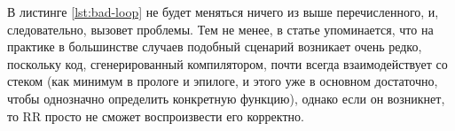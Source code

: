 В листинге \ref{lst:bad-loop} не будет меняться ничего из выше перечисленного,
и, следовательно, вызовет проблемы. Тем не менее, в статье \cite{rr-paper}
упоминается, что на практике в большинстве случаев подобный сценарий возникает
очень редко, поскольку код, сгенерированный компилятором, почти всегда
взаимодействует со стеком (как минимум в прологе и эпилоге, и этого уже в
основном достаточно, чтобы однозначно определить конкретную функцию), однако
если он возникнет, то RR просто не сможет воспроизвести его корректно.